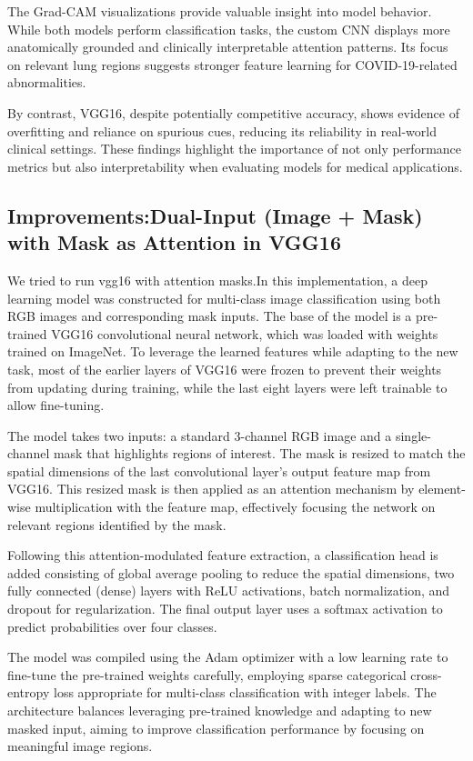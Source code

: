\documentclass{article}
\begin{document}
\vspace{1em}
The Grad-CAM visualizations provide valuable insight into model behavior. While both models perform classification tasks, the custom CNN displays more anatomically grounded and clinically interpretable attention patterns. Its focus on relevant lung regions suggests stronger feature learning for COVID-19-related abnormalities.

By contrast, VGG16, despite potentially competitive accuracy, shows evidence of overfitting and reliance on spurious cues, reducing its reliability in real-world clinical settings. These findings highlight the importance of not only performance metrics but also interpretability when evaluating models for medical applications.

\subsection{Improvements:Dual-Input (Image + Mask) with Mask as Attention in VGG16}We tried to run vgg16 with attention masks.In this implementation, a deep learning model was constructed for multi-class image classification using both RGB images and corresponding mask inputs. The base of the model is a pre-trained VGG16 convolutional neural network, which was loaded with weights trained on ImageNet. To leverage the learned features while adapting to the new task, most of the earlier layers of VGG16 were frozen to prevent their weights from updating during training, while the last eight layers were left trainable to allow fine-tuning.

The model takes two inputs: a standard 3-channel RGB image and a single-channel mask that highlights regions of interest. The mask is resized to match the spatial dimensions of the last convolutional layer’s output feature map from VGG16. This resized mask is then applied as an attention mechanism by element-wise multiplication with the feature map, effectively focusing the network on relevant regions identified by the mask.

Following this attention-modulated feature extraction, a classification head is added consisting of global average pooling to reduce the spatial dimensions, two fully connected (dense) layers with ReLU activations, batch normalization, and dropout for regularization. The final output layer uses a softmax activation to predict probabilities over four classes.

The model was compiled using the Adam optimizer with a low learning rate to fine-tune the pre-trained weights carefully, employing sparse categorical cross-entropy loss appropriate for multi-class classification with integer labels. The architecture balances leveraging pre-trained knowledge and adapting to new masked input, aiming to improve classification performance by focusing on meaningful image regions.
\end{document}
